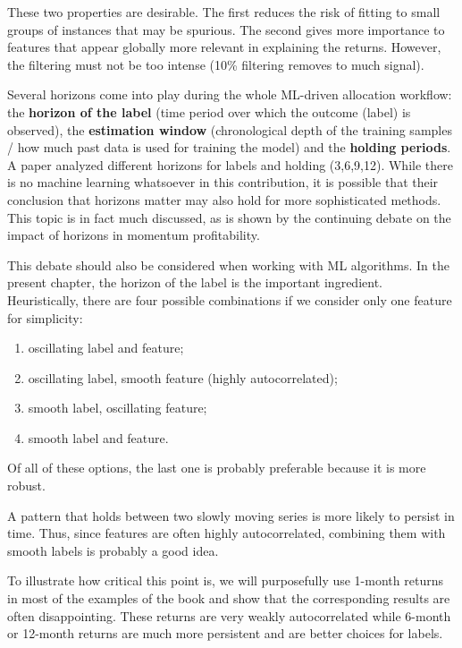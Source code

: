 These two properties are desirable. The first reduces the risk of fitting to small groups of instances that may be spurious. The second gives more importance to features that appear globally more relevant in explaining the returns. However, the filtering must not be too intense (10\% filtering removes to much signal).

Several horizons come into play during the whole ML-driven allocation workflow: the \textbf{horizon of the label} (time period over which the outcome (label) is observed), the \textbf{estimation window} (chronological depth of the training samples / how much past data is used for training the model) and the \textbf{holding periods}. A paper analyzed different horizons for labels and holding (3,6,9,12). While there is no machine learning whatsoever in this contribution, it is possible that their conclusion that horizons matter may also hold for more sophisticated methods. This topic is in fact much discussed, as is shown by the continuing debate on the impact of horizons in momentum profitability.

This debate should also be considered when working with ML algorithms. In the present chapter, the horizon of the label is the important ingredient. Heuristically, there are four possible combinations if we consider only one feature for simplicity:
\begin{enumerate}
    \item oscillating label and feature;
    \item oscillating label, smooth feature (highly autocorrelated);
    \item smooth label, oscillating feature;
    \item smooth label and feature.
\end{enumerate}

Of all of these options, the last one is probably preferable because it is more robust. 


A pattern that holds between two slowly moving series is more likely to persist in time. Thus, since features are often highly autocorrelated, combining them with smooth labels is probably a good idea.

To illustrate how critical this point is, we will purposefully use 1-month returns in most of the examples of the book and show that the corresponding results are often disappointing. These returns are very weakly autocorrelated while 6-month or 12-month returns are much more persistent and are better choices for labels.


